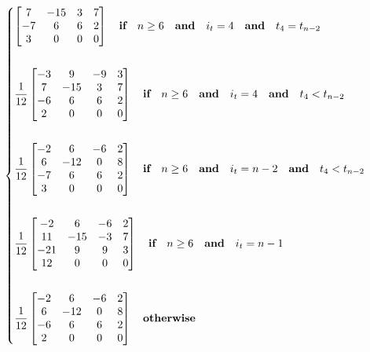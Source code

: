 \documentclass{article}
\begin{document}
\begin{equation}
\begin{dcases}
\begin{bmatrix}
                                         7 & -15 & 3 & 7\\
                                        -7 & 6 & 6 & 2\\
                                         3 & 0 & 0 & 0 \end{bmatrix} \quad \textbf{if} \quad n \geq 6 \quad \textbf{and} \quad i_t = 4 \quad \textbf{and} \quad t_{4} = t_{n-2}  \\\\
            \frac{1}{12}\begin{bmatrix} -3 &  9 & -9 & 3 \\
                                         7 & -15 &  3 & 7\\
                                        -6 &  6 & 6 & 2\\
                                         2 &  0 &  0 & 0 \end{bmatrix} \quad \textbf{if} \quad n \geq 6 \quad \textbf{and} \quad i_t = 4 \quad \textbf{and} \quad t_{4} < t_{n-2}  \\\\
            \frac{1}{12}\begin{bmatrix} -2 &  6 & -6 & 2 \\
                                         6 & -12 &  0 & 8\\
                                        -7 &  6 & 6 & 2\\
                                         3 &  0 &  0 & 0 \end{bmatrix} \quad \textbf{if} \quad n \geq 6 \quad \textbf{and} \quad i_t = n-2 \quad \textbf{and} \quad t_{4} < t_{n-2}  \\\\
            \frac{1}{12}\begin{bmatrix} -2 &  6 & -6 & 2 \\
                                         11 & -15  & -3 &  7\\
                                        -21&  9   &  9 &  3\\
                                         12 &  0   &  0 &  0 \end{bmatrix} \quad \textbf{if} \quad n \geq 6 \quad \textbf{and} \quad i_t = n-1 \\\\
            \frac{1}{12}\begin{bmatrix} -2 &  6 & -6 & 2\\
                                         6 & -12 &  0 & 8\\
                                        -6 &  6 &  6 & 2\\
                                         2 &  0 &  0 & 0\end{bmatrix} \quad \textbf{otherwise}
        \end{dcases}
    \end{equation}
\end{document}
